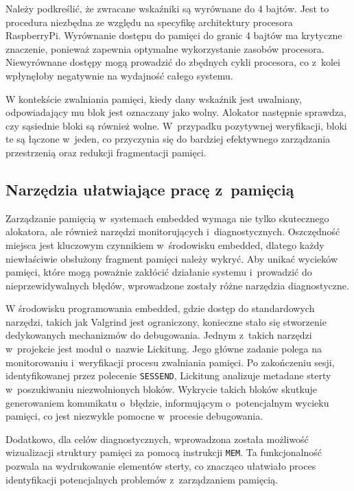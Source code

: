 \documentclass[shortabstract]{iithesis}
\begin{document}
Należy podkreślić, że zwracane wskaźniki są wyrównane do 4 bajtów. Jest to procedura niezbędna ze względu na specyfikę architektury procesora RaspberryPi. Wyrównanie dostępu do pamięci do granic 4 bajtów ma krytyczne znaczenie, ponieważ zapewnia optymalne wykorzystanie zasobów procesora. Niewyrównane dostępy mogą prowadzić do zbędnych cykli procesora, co z~kolei wpłynęłoby negatywnie na wydajność całego systemu.

W kontekście zwalniania pamięci, kiedy dany wskaźnik jest uwalniany, odpowiadający mu blok jest oznaczany jako wolny. Alokator następnie sprawdza, czy sąsiednie bloki są również wolne. W~przypadku pozytywnej weryfikacji, bloki te są łączone w~jeden, co przyczynia się do bardziej efektywnego zarządzania przestrzenią oraz redukcji fragmentacji pamięci.
\subsection{Narzędzia ułatwiające pracę z~pamięcią}
Zarządzanie pamięcią w~systemach embedded wymaga nie tylko skutecznego alokatora, ale również narzędzi monitorujących i~diagnostycznych. Oszczędność miejsca jest kluczowym czynnikiem w~środowisku embedded, dlatego każdy niewłaściwie obsłużony fragment pamięci należy wykryć. Aby unikać wycieków pamięci, które mogą poważnie zakłócić działanie systemu i~prowadzić do nieprzewidywalnych błędów, wprowadzone zostały różne narzędzia diagnostyczne.

W środowisku programowania embedded, gdzie dostęp do standardowych narzędzi, takich jak Valgrind jest ograniczony, konieczne stało się stworzenie dedykowanych mechanizmów do debugowania. Jednym z~takich narzędzi w~projekcie jest moduł o~nazwie Lickitung. Jego główne zadanie polega na monitorowaniu i~weryfikacji procesu zwalniania pamięci. Po zakończeniu sesji, identyfikowanej przez polecenie \texttt{SESSEND}, Lickitung analizuje metadane sterty w~poszukiwaniu niezwolnionych bloków. Wykrycie takich bloków skutkuje generowaniem komunikatu o~błędzie, informującym o~potencjalnym wycieku pamięci, co jest niezwykle pomocne w~procesie debugowania.

Dodatkowo, dla celów diagnostycznych, wprowadzona została możliwość wizualizacji struktury pamięci za pomocą instrukcji \texttt{MEM}. Ta funkcjonalność pozwala na wydrukowanie elementów sterty, co znacząco ułatwiało proces identyfikacji potencjalnych problemów z~zarządzaniem pamięcią.
\end{document}
